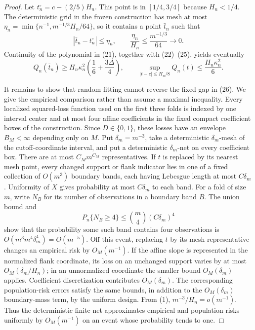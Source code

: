 \documentclass{article}
\begin{document}
\begin{proof}
Let \(t_n^\circ=c-(2/5)H_n\).  This point is in \([1/4,3/4]\) because
\(H_n<1/4\).  The deterministic grid in the frozen construction has
mesh at most
\(\eta_n=\min\{n^{-1},m^{-1/3}H_n/64\}\), so it contains a point
\(\bar t_n\) such that
\[
 |\bar t_n-t_n^\circ|\le\eta_n,
 \qquad
 \frac{\eta_n}{H_n}\le\frac{m^{-1/3}}{64}\longrightarrow0.
 \tag{25}
\]
Continuity of the polynomial in (21), together with (22)--(25), yields
eventually
\[
 Q_n(\bar t_n)
 \ge H_n\kappa_n^2\left(\frac16+\frac{3\Delta}{4}\right),
 \qquad
 \sup_{|t-c|\le H_n/8}Q_n(t)
 \le\frac{H_n\kappa_n^2}{6}.
 \tag{26}
\]

It remains to show that random fitting cannot reverse the fixed gap in
(26).  We give the empirical comparison rather than assume a maximal
inequality.  Every localized squared-loss function used on the first
three folds is indexed by one interval center and at most four affine
coefficients in the fixed compact coefficient boxes of the
construction.  Since \(D\in\{0,1\}\), these losses have an envelope
\(B_M<\infty\) depending only on \(M\).  Put
\(\delta_m=m^{-3}\), take a deterministic \(\delta_m\)-mesh of the
cutoff-coordinate interval, and put a deterministic
\(\delta_m\)-net on every coefficient box.  There are at most
\(C_Mm^{C_M}\) representatives.  If \(t\) is replaced by its nearest
mesh point, every changed support or flank indicator lies in one of a
fixed collection of \(O(m^3)\) boundary bands, each having Lebesgue
length at most \(C\delta_m\).  Uniformity of \(X\) gives probability at
most \(C\delta_m\) to each band.  For a fold of size \(m\), write
\(N_B\) for its number of observations in a boundary band \(B\).  The
union bound and
\[
 P_n\{N_B\ge4\}\le {m\choose4}(C\delta_m)^4
\]
show that the probability some such band contains four observations
is \(O(m^3m^4\delta_m^4)=O(m^{-5})\).  Off this event, replacing \(t\)
by its mesh representative changes an empirical risk by
\(O_M(m^{-1})\).  If the affine slope is represented in the normalized
flank coordinate, its loss on an unchanged support varies by at most
\(O_M(\delta_m/H_n)\); in an unnormalized coordinate the smaller bound
\(O_M(\delta_m)\) applies.  Coefficient discretization contributes
\(O_M(\delta_m)\).  The corresponding population-risk errors satisfy
the same bounds, in addition to the \(O_M(\delta_m)\) boundary-mass
term, by the uniform design.  From (1),
\(m^{-3}/H_n=o(m^{-1})\).  Thus the deterministic finite net
approximates empirical and population risks uniformly by
\(O_M(m^{-1})\) on an event whose probability tends to one.


\end{proof}
\end{document}
